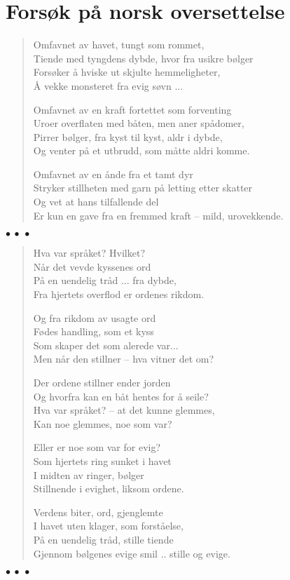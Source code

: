 \documentclass[12pt]{article}
\newenvironment{wier}
	{\begin{verse}}
	{\end{verse} \begin{center}$\bullet\ \bullet\ \bullet$\end{center}}
\begin{document}
\section*{Fors{\o}k p{\aa} norsk oversettelse}
\begin{wier}
Omfavnet av havet, tungt som rommet,\\
Tiende med tyngdens dybde, hvor fra usikre b{\o}lger\\
Fors{\o}ker {\aa} hviske ut skjulte hemmeligheter,\\
{\AA} vekke monsteret fra evig s{\o}vn ...

Omfavnet av en kraft fortettet som forventing\\
Uroer overflaten med b{\aa}ten, men aner sp{\aa}domer,\\
Pirrer b{\o}lger, fra kyst til kyst, aldr i dybde,\\
Og venter p{\aa} et utbrudd, som m{\aa}tte aldri komme.

Omfavnet av en {\aa}nde fra et tamt dyr\\
Stryker stillheten med garn p{\aa} letting etter skatter\\
Og vet at hans tilfallende del\\
Er kun en gave fra en fremmed kraft -- mild, urovekkende.
\end{wier}

\begin{wier}
Hva var spr{\aa}ket? Hvilket?\\
N{\aa}r det vevde kyssenes ord\\
P{\aa} en uendelig tr{\aa}d ... fra dybde,\\
Fra hjertets overflod er ordenes rikdom.

Og fra rikdom av usagte ord\\
F{\o}des handling, som et kyss\\
Som skaper det som alerede var...\\
Men n{\aa}r den stillner -- hva vitner det om?

Der ordene stillner ender jorden\\
Og hvorfra kan en b{\aa}t hentes for {\aa} seile?\\
Hva var spr{\aa}ket? -- at det kunne glemmes,\\
Kan noe glemmes, noe som var?

Eller er noe som var for evig?\\
Som hjertets ring sunket i havet\\
I midten av ringer, b{\o}lger\\
Stillnende i evighet, liksom ordene.

Verdens biter, ord, gjenglemte\\
I havet uten klager, som forst{\aa}else,\\
P{\aa} en uendelig tr{\aa}d, stille tiende\\
Gjennom b{\o}lgenes evige smil .. stille og evige.
\end{wier}
\end{document}
